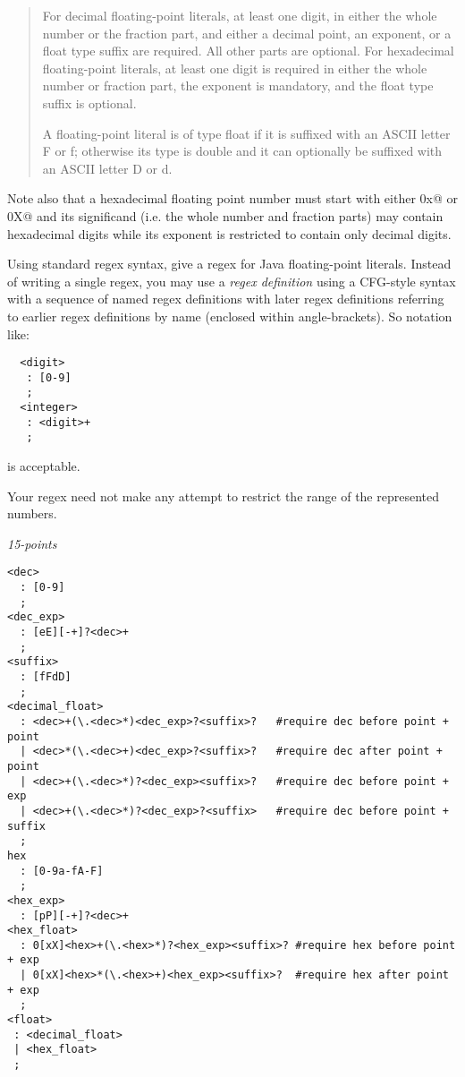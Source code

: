 \documentclass[12pt]{article}
\begin{document}
\begin{enumerate}
\begin{quote}
    For decimal floating-point literals, at least one digit, in either
    the whole number or the fraction part, and either a decimal point,
    an exponent, or a float type suffix are required. All other parts
    are optional. For hexadecimal floating-point literals, at least
    one digit is required in either the whole number or fraction part,
    the exponent is mandatory, and the float type suffix is optional.

    A floating-point literal is of type float if it is suffixed with
    an ASCII letter F or f; otherwise its type is double and it can
    optionally be suffixed with an ASCII letter D or d.

  \end{quote}

  Note also that a hexadecimal floating point number must start with
  either \verb@0x@ or \verb@0X@ and its significand (i.e. the whole
  number and fraction parts) may contain hexadecimal digits while its
  exponent is restricted to contain only decimal digits.

  Using standard regex syntax, give a regex for Java floating-point
  literals.  Instead of writing a single regex, you may use a \textit
  {regex definition} using a CFG-style syntax with a sequence of named
  regex definitions with later regex definitions referring to earlier
  regex definitions by name (enclosed within angle-brackets).  So
  notation like:
\begin{verbatim}
  <digit>
   : [0-9]
   ;
  <integer>
   : <digit>+
   ;
\end{verbatim}
is acceptable.

Your regex need not make any attempt to restrict the range of the
represented numbers.

\hfill\textit{15-points}

\begin{verbatim}
<dec>
  : [0-9]
  ;
<dec_exp>
  : [eE][-+]?<dec>+
  ;
<suffix>
  : [fFdD]
  ;
<decimal_float>
  : <dec>+(\.<dec>*)<dec_exp>?<suffix>?   #require dec before point + point 
  | <dec>*(\.<dec>+)<dec_exp>?<suffix>?   #require dec after point + point
  | <dec>+(\.<dec>*)?<dec_exp><suffix>?   #require dec before point + exp
  | <dec>+(\.<dec>*)?<dec_exp>?<suffix>   #require dec before point + suffix
  ;
hex
  : [0-9a-fA-F]
  ;
<hex_exp>
  : [pP][-+]?<dec>+
<hex_float>
  : 0[xX]<hex>+(\.<hex>*)?<hex_exp><suffix>? #require hex before point + exp
  | 0[xX]<hex>*(\.<hex>+)<hex_exp><suffix>?  #require hex after point + exp
  ;
<float>
 : <decimal_float>
 | <hex_float>
 ;
\end{verbatim}


\end{enumerate}
\end{document}
